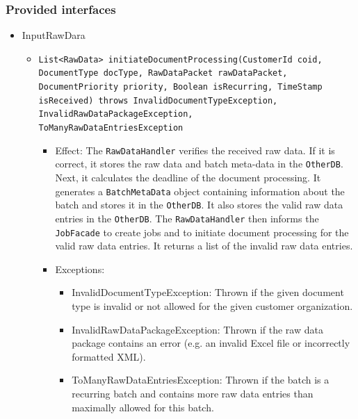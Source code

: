 \documentclass[a4paper,10pt]{article}
\begin{document}
\subsubsection*{Provided interfaces}
\begin{itemize}
    \item InputRawDara
    \begin{itemize}
        \item \texttt{List<RawData> initiateDocumentProcessing(CustomerId coid, DocumentType docType, RawDataPacket rawDataPacket, DocumentPriority priority, Boolean isRecurring, TimeStamp isReceived) throws InvalidDocumentTypeException, InvalidRawDataPackageException,\\ ToManyRawDataEntriesException}
        \begin{itemize}
            \item Effect: The \texttt{RawDataHandler} verifies the received raw data. If it is correct, it stores the raw data and batch meta-data in the \texttt{OtherDB}. Next, it calculates the deadline of the document processing. It generates a \texttt{BatchMetaData} object containing information about the batch and stores it in the \texttt{OtherDB}. It also stores the valid raw data entries in the \texttt{OtherDB}. The \texttt{RawDataHandler} then informs the \texttt{JobFacade} to create jobs and to initiate document processing for the valid raw data entries. It returns a list of the invalid raw data entries.
            \item Exceptions:
            \begin{itemize}
                \item InvalidDocumentTypeException: Thrown if the given document type is invalid or not allowed for the given customer organization.
            	\item InvalidRawDataPackageException: Thrown if the raw data package contains an error (e.g. an invalid Excel file or incorrectly formatted XML).
            	\item ToManyRawDataEntriesException: Thrown if the batch is a recurring batch and contains more raw data entries than maximally allowed for this batch.
            \end{itemize}
        \end{itemize}
    \end{itemize} 
\end{itemize}
\end{document}
